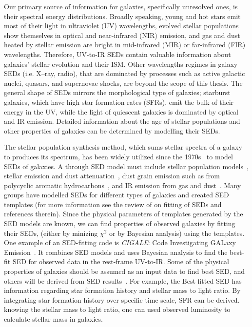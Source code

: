 Our primary source of information for galaxies, specifically unresolved ones, is their spectral energy distributions. 
Broadly speaking, young and hot stars emit most of their light in ultraviolet (UV) wavelengths, evolved stellar populations show themselves in optical and near-infrared (NIR) emission, and gas and dust heated by stellar emission are bright in mid-infrared (MIR) or far-infrared (FIR) wavelengths.
Therefore, UV-to-IR SEDs contain valuable information about galaxies' stellar evolution and their ISM. 
Other wavelengths regimes in galaxy SEDs (i.e. X--ray, radio), that are dominated by processes such as active galactic nuclei, quasars, and supernovae shocks, are beyond the scope of this thesis.
The general shape of SEDs mirrors the morphological type of galaxies; starburst galaxies, which have high star formation rates (SFRs), emit the bulk of their energy in the UV, while the light of quiescent galaxies is dominated by optical and IR emission. 
Detailed information about the age of stellar populations and other properties of galaxies can be determined by modelling their SEDs.

The stellar population synthesis method, which sums stellar spectra of a galaxy to produces its spectrum, has been widely utilized since the 1970s~\citep[e.g.][]{Tinsley72,Searle73} to model SEDs of galaxies.
A through SED model must include stellar population models~\citep[e.g.][]{Bruzual93,Bruzual03,Maraston05}, stellar emission and dust attenuation~\citep[e.g.][]{Calzetti00,Dopita05}, dust grain emission such as from polycyclic aromatic hydrocarbons~\citep[PAHs; e.g.][and references therein]{Tielens08}, and IR emission from gas and dust~\citep[e.g.][]{Chary01,Dale02,Lagache03,Lagache04,Smith07a,Draine07}.
Many groups have modelled SEDs for different types of galaxies and created SED templates (for more information see the review of \cite{Walcher11} on fitting of SEDs and references therein).
Since the physical parameters of templates generated by the SED models are known, we can find properties of observed galaxies by fitting their SEDs, (either by minizing $\chi^2$ or by Bayesian analysis)  using the templates.
One example of an SED-fitting code is {\em CIGALE}: Code Investigating GALaxy Emission~\citep{Noll09}.
It combines SED models and uses Bayesian analysis to find the best-fit SED for observed data in the rest-frame UV-to-IR.
Some of the physical properties of galaxies should be assumed as an input data to find best SED, and others will be derived from SED results~\citep[See][for more detail]{Walcher08}.
For example, the Best fitted SED has information regarding star formation history and stellar mass to light ratio.
By integrating star formation history over specific time scale, SFR can be derived. 
knowing the stellar mass to light ratio, one can used observed luminosity to calculate stellar mass in galaxies.

